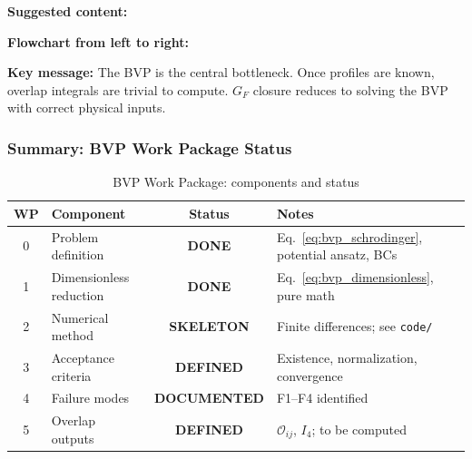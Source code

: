 \begin{tcolorbox}[colback=gray!10, colframe=gray!50, title=\textbf{Figure Placeholder 2: Overlap Integral Pipeline}]
\textbf{Suggested content:}

\textbf{Flowchart from left to right:}
\begin{center}
\end{center}

\textbf{Key message:} The BVP is the central bottleneck. Once profiles are known,
overlap integrals are trivial to compute. $G_F$ closure reduces to solving the BVP
with correct physical inputs.
\end{tcolorbox}

\subsubsection{Summary: BVP Work Package Status}
\label{sec:bvp_summary}

\begin{table}[ht]
\centering
\caption{BVP Work Package: components and status}
\label{tab:bvp_wp_status}
\small
\begin{tabular}{clcl}
\toprule
\textbf{WP} & \textbf{Component} & \textbf{Status} & \textbf{Notes} \\
\midrule
0 & Problem definition & \textcolor{OliveGreen}{\textbf{DONE}} & Eq.~\eqref{eq:bvp_schrodinger}, potential ansatz, BCs \\
1 & Dimensionless reduction & \textcolor{OliveGreen}{\textbf{DONE}} & Eq.~\eqref{eq:bvp_dimensionless}, pure math \\
2 & Numerical method & \textcolor{YellowOrange}{\textbf{SKELETON}} & Finite differences; see \texttt{code/} \\
3 & Acceptance criteria & \textcolor{OliveGreen}{\textbf{DEFINED}} & Existence, normalization, convergence \\
4 & Failure modes & \textcolor{OliveGreen}{\textbf{DOCUMENTED}} & F1--F4 identified \\
5 & Overlap outputs & \textcolor{YellowOrange}{\textbf{DEFINED}} & $\mathcal{O}_{ij}$, $I_4$; to be computed \\
\bottomrule
\end{tabular}
\end{table}

